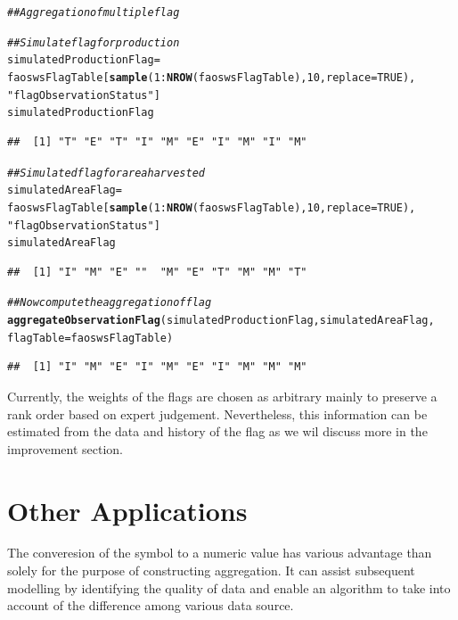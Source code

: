 \documentclass[nojss]{jss}\usepackage[]{graphicx}\usepackage[]{color}
\makeatletter
\newcommand{\hlnum}[1]{\textcolor[rgb]{0.686,0.059,0.569}{#1}}%
\newcommand{\hlstr}[1]{\textcolor[rgb]{0.192,0.494,0.8}{#1}}%
\newcommand{\hlcom}[1]{\textcolor[rgb]{0.678,0.584,0.686}{\textit{#1}}}%
\newcommand{\hlopt}[1]{\textcolor[rgb]{0,0,0}{#1}}%
\newcommand{\hlstd}[1]{\textcolor[rgb]{0.345,0.345,0.345}{#1}}%
\newcommand{\hlkwb}[1]{\textcolor[rgb]{0.69,0.353,0.396}{#1}}%
\newcommand{\hlkwc}[1]{\textcolor[rgb]{0.333,0.667,0.333}{#1}}%
\newcommand{\hlkwd}[1]{\textcolor[rgb]{0.737,0.353,0.396}{\textbf{#1}}}%
\newenvironment{kframe}{%
 \def\at@end@of@kframe{}%
 \ifinner\ifhmode%
  \def\at@end@of@kframe{\end{minipage}}%
  \begin{minipage}{\columnwidth}%
 \fi\fi%
 \def\FrameCommand##1{\hskip\@totalleftmargin \hskip-\fboxsep
 \colorbox{shadecolor}{##1}\hskip-\fboxsep
     \hskip-\linewidth \hskip-\@totalleftmargin \hskip\columnwidth}%
 \MakeFramed {\advance\hsize-\width
   \@totalleftmargin\z@ \linewidth\hsize
   \@setminipage}}%
 {\par\unskip\endMakeFramed%
 \at@end@of@kframe}
\newenvironment{knitrout}{}{} %
\makeatother
\begin{document}
\begin{knitrout}
\color{fgcolor}\begin{kframe}
\begin{alltt}
\hlcom{## Aggregation of multiple flag}

\hlcom{## Simulate flag for production}
\hlstd{simulatedProductionFlag} \hlkwb{=}
    \hlstd{faoswsFlagTable[}\hlkwd{sample}\hlstd{(}\hlnum{1}\hlopt{:}\hlkwd{NROW}\hlstd{(faoswsFlagTable),} \hlnum{10}\hlstd{,} \hlkwc{replace} \hlstd{=} \hlnum{TRUE}\hlstd{),}
                    \hlstr{"flagObservationStatus"}\hlstd{]}
\hlstd{simulatedProductionFlag}
\end{alltt}
\begin{verbatim}
##  [1] "T" "E" "T" "I" "M" "E" "I" "M" "I" "M"
\end{verbatim}
\begin{alltt}
\hlcom{## Simulated flag for area harvested}
\hlstd{simulatedAreaFlag} \hlkwb{=}
    \hlstd{faoswsFlagTable[}\hlkwd{sample}\hlstd{(}\hlnum{1}\hlopt{:}\hlkwd{NROW}\hlstd{(faoswsFlagTable),} \hlnum{10}\hlstd{,} \hlkwc{replace} \hlstd{=} \hlnum{TRUE}\hlstd{),}
                    \hlstr{"flagObservationStatus"}\hlstd{]}
\hlstd{simulatedAreaFlag}
\end{alltt}
\begin{verbatim}
##  [1] "I" "M" "E" ""  "M" "E" "T" "M" "M" "T"
\end{verbatim}
\begin{alltt}
\hlcom{## Now compute the aggregation of flag}
\hlkwd{aggregateObservationFlag}\hlstd{(simulatedProductionFlag, simulatedAreaFlag,}
                         \hlkwc{flagTable} \hlstd{= faoswsFlagTable)}
\end{alltt}
\begin{verbatim}
##  [1] "I" "M" "E" "I" "M" "E" "I" "M" "M" "M"
\end{verbatim}
\end{kframe}
\end{knitrout}


Currently, the weights of the flags are chosen as arbitrary mainly to
preserve a rank order based on expert judgement. Nevertheless, this
information can be estimated from the data and history of the flag as
we wil discuss more in the improvement section.



\section{Other Applications}
The converesion of the symbol to a numeric value has various advantage
than solely for the purpose of constructing aggregation. It can assist
subsequent modelling by identifying the quality of data and enable an
algorithm to take into account of the difference among various data
source.
\end{document}
